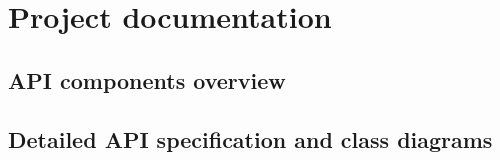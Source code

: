 
\chapter{Project documentation} \label{chap:docs}

\section{API components overview} \label{sec:api-overview}

\section{Detailed API specification and class diagrams} \label{sec:api-detail}
